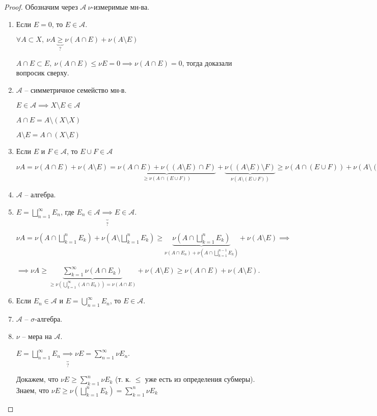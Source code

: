 \begin{proof}
    Обозначим через $\mathcal{A} \ \nu$-измеримые мн-ва. 

    \begin{enumerate}
        \item {
            Если $E = 0$, то $E \in \mathcal{A}$. 

            $\forall A \subset X, \ \nu A \underbrace{\geq}_{?} \nu (A \cap E) + \nu (A \setminus E)$

            $A \cap E \subset E, \ \nu (A \cap E) \leq \nu E = 0 \implies \nu (A \cap E) = 0$, тогда доказали вопросик сверху. 
        }
        \item {
            $\mathcal{A}$ -- симметричное семейство мн-в.
            
            $E \in \mathcal{A} \implies X \setminus E \in \mathcal{A}$
            
            $A \cap E = A \setminus (X \setminus X)$

            $A \setminus E = A \cap (X \setminus E)$
        }
        \item {
            Если $E$ и $F \in \mathcal{A}$, то $E \cup F \in \mathcal{A}$
            
            $\nu A = \nu (A \cap E) + \nu (A \setminus E) = \underbrace{\nu (A \cap E) + \nu ((A \setminus E) \cap F)}_{\geq \nu (A \cap (E \cup F))} + \underbrace{\nu ((A \setminus E) \setminus F)}_{\nu (A \setminus (E \cup F))} \geq \nu (A \cap (E \cup F)) + \nu (A \setminus (E \cup F))$
        }
        \item $\mathcal{A}$ -- алгебра.
        \item {
            $E = \bigsqcup_{n=1}^{\infty}E_n$, где $E_n \in \mathcal{A} \underbrace{\implies}_{?} E \in \mathcal{A}$.

            $\nu A = \nu (A \cap \bigsqcup_{k=1}^{n} E_k) + \nu (A \setminus \bigsqcup_{k=1}^{n} E_k) \geq \underbrace{\nu (A \cap \bigsqcup_{k=1}^{n} E_k)}_{\nu (A \cap E_n) + \nu (A \cap \bigsqcup_{k=1}^{n-1}E_k)} + \nu (A \setminus E) \implies$
            
            $\implies \nu A \geq \underbrace{\sum_{k=1}^{\infty} \nu (A \cap E_k)}_{\geq \nu (\bigcup_{k=1}^{\infty} (A \cap E_k)) = \nu (A \cap E)} + \nu (A \setminus E) \geq \nu (A \cap E) + \nu (A \setminus E)$.

        }
        \item Если $E_n \in \mathcal{A}$ и $E = \bigcup_{n=1}^{\infty} E_n$, то $E \in \mathcal{A}$.
        \item $\mathcal{A}$ -- $\sigma$-алгебра.
        \item {
            $\nu$ -- мера на $\mathcal{A}$.

            $E = \bigsqcup_{n=1}^{\infty} E_n \underbrace{\implies}_{?} \nu E = \sum_{n=1}^{\infty} \nu E_n$.

            Докажем, что $\nu E \geq \sum_{k=1}^{n} \nu E_k$ (т. к. $\leq$ уже есть из определения субмеры). Знаем, что $\nu E \geq \nu (\bigsqcup_{k=1}^{n} E_k) = \sum_{k=1}^{n} \nu E_k$
        }
    \end{enumerate}
\end{proof}


